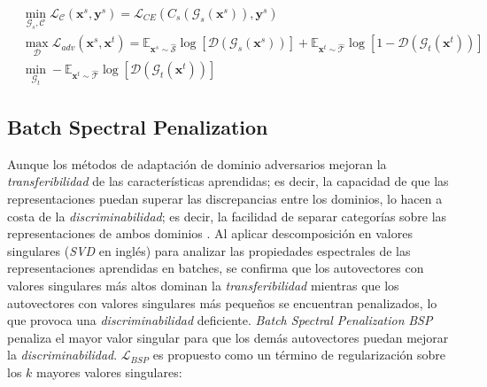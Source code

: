 \begin{align}
   & \min_{\mathcal{G}_s, \mathcal{C}} \mathcal{L}_\mathcal{C}(\mathbf{x}^s, \mathbf{y}^s)                                                            = \mathcal{L}_{CE}(C_s(\mathcal{G}_s(\mathbf{x}^s)), \mathbf{y}^s)
  \label{eq:adda-loss-clasificadora}                                                                                                                                                                                                                                                                                                                                                          \\
   & \max_{\mathcal{D}} \mathcal{L}_{adv}(\mathbf{x}^s, \mathbf{x}^t)                                                                                 = \mathbb{E}_{\mathbf{x}^s \sim \mathcal{\hat{S}}}\log[\mathcal{D}(\mathcal{G}_s(\mathbf{x}^s))] + \mathbb{E}_{\mathbf{x}^t \sim \mathcal{\hat{T}}}\log[1-\mathcal{D}(\mathcal{G}_t(\mathbf{x}^t))] \label{eq:adda-loss-discriminadora} \\
   & \min_{\mathcal{G}_t} - \mathbb{E}_{\mathbf{x}^t \sim \mathcal{\hat{T}}} \log[\mathcal{D}(\mathcal{G}_t(\mathbf{x}^t))]  \label{eq:adda-objetivo}
\end{align}

\subsection{Batch Spectral Penalization}

Aunque los métodos de adaptación de dominio adversarios mejoran la {\it transferibilidad} de las características
aprendidas; es decir, la capacidad de que las representaciones puedan superar las discrepancias entre los dominios, lo
hacen a costa de la {\it discriminabilidad}; es decir, la facilidad de separar categorías sobre las representaciones de
ambos dominios \parencite{chen2019transferability}. Al aplicar descomposición en valores singulares ({\it SVD} en inglés) para analizar
las propiedades espectrales de las representaciones aprendidas en batches, se confirma que los autovectores con valores
singulares más altos dominan la {\it transferibilidad} mientras que los autovectores con valores singulares más
pequeños se encuentran penalizados, lo que provoca una {\it discriminabilidad} deficiente. {\it Batch Spectral
    Penalization} {\it BSP} \parencite{chen2019transferability} penaliza el mayor valor singular para que los demás autovectores puedan mejorar la {\it
    discriminabilidad}. $\mathcal{L}_{BSP}$ es propuesto como un término de regularización sobre los $k$ mayores valores
singulares:

